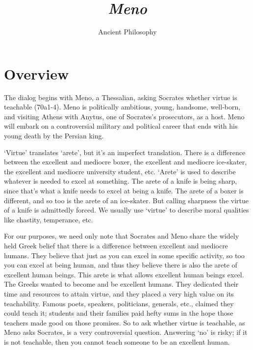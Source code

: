 \documentclass[10 pt]{article}
\begin{document}
\author{Ancient Philosophy}
\title{\emph{Meno}}

\section*{Overview}
The dialog begins with Meno, a Thessalian, asking Socrates whether virtue is teachable (70a1-4). Meno is politically ambitious, young, handsome, well-born, and visiting Athens with Anytus, one of Socrates's prosecutors, as a host.  Meno will embark on a controversial military and political career that ends with his young death by the Persian king.  

`Virtue' translates `arete', but it's an imperfect translation. There is a difference between the excellent and mediocre boxer, the excellent and mediocre ice-skater, the excellent and mediocre university student, etc. `Arete' is used to describe whatever is needed to excel at something.  The arete of a knife is being sharp, since that's what a knife needs to excel at being a knife. The arete of a boxer is different, and so too is the arete of an ice-skater.  But calling sharpness the virtue of a knife is admittedly forced. We usually use `virtue' to describe moral qualities like chastity, temperance, etc.

For our purposes, we need only note that Socrates and Meno share the widely held Greek belief that there is a difference between excellent and mediocre humans. They believe that just as you can excel in some specific activity, so too you can excel at being human, and thus they believe there is also the arete of excellent human beings. This arete is what allows excellent human beings excel. The Greeks wanted to become and be excellent humans. They dedicated their time and resources to attain virtue, and they placed a very high value on its teachability.  Famous poets, speakers, politicians, generals, etc., claimed they could teach it; students and their families paid hefty sums in the hope those teachers made good on those promises. So to ask whether virtue is teachable, as Meno asks Socrates, is a very controversial question. Answering `no' is risky; if it is not teachable, then you cannot teach someone to be an excellent human. 
\end{document}
